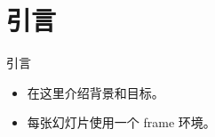 \section{引言}
\begin{frame}{引言}
    \begin{itemize}
        \item 在这里介绍背景和目标。
        \item 每张幻灯片使用一个 frame 环境。
    \end{itemize}
\end{frame}
